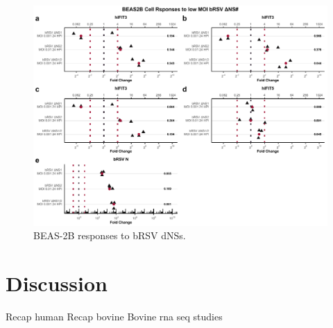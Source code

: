 \begin{figure}
    \centering
    \includegraphics[width=1\linewidth]{06. Chapter 1/Figs/01. Induction/12. beas2b_brsv_dns.pdf}
    \caption[BEAS-2B responses to bRSV dNSs.]{BEAS-2B responses to bRSV dNSs.}
    \label{BEAS-2B responses to bRSV dNSs.}
\end{figure}

\section{Discussion} \label{Discussion}
Recap human \newline
Recap bovine \newline
Bovine rna seq studies